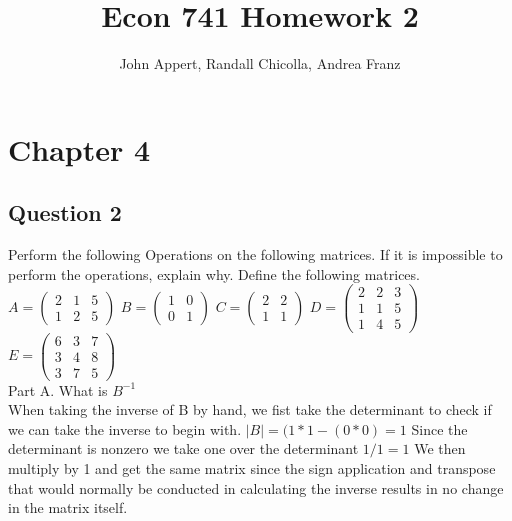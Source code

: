 \documentclass{article}
\begin{document}
\title{Econ 741 Homework 2}
\author{John Appert, Randall Chicolla, Andrea Franz}
\maketitle

\section{Chapter 4}

\subsection{Question 2}
Perform the following Operations on the following matrices. If it is impossible to perform the operations, explain why. Define the following matrices. \\

$A = \left( \begin{smallmatrix} 2&1&5\\ 1&2&5 \end{smallmatrix} \right)$
$B = \left( \begin{smallmatrix} 1&0\\0&1 \end{smallmatrix} \right)$
$C = \left( \begin{smallmatrix} 2&2\\1&1 \end{smallmatrix} \right)$
$D = \left( \begin{smallmatrix} 2&2&3\\1&1&5\\1&4&5 \end{smallmatrix} \right)$
$E = \left( \begin{smallmatrix} 6&3&7\\3&4&8\\3&7&5 \end{smallmatrix} \right)$\\

Part A. What is $B^{-1}$ \\
	
When taking the inverse of B by hand, we fist take the determinant to check if we can take the inverse to begin with. $|B|=(1*1-(0*0)=1$ Since the determinant is nonzero we take one over the determinant $1/1=1$ We then multiply by 1 and get the same matrix since the sign application and transpose that would normally be conducted in calculating the inverse results in no change in the matrix itself.\\
\end{document}
